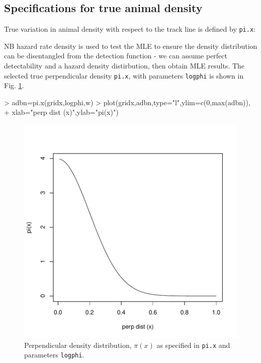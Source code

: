 \documentclass{article}
\begin{document}
\subsection{Specifications for true animal density} 
True variation in animal density with respect to the track line is defined by \texttt{pi.x}:
\begin{Schunk}
\end{Schunk}
NB hazard rate density is used to test the MLE to ensure the density distribution can be disentangled from the detection function -  we can assume perfect detectability and a hazard density distirbution, then obtain MLE results.  The selected true perpendicular density \texttt{pi.x}, with parameters \texttt{logphi} is shown in Fig. \ref{fig:perp.den}.
\begin{Schunk}
\begin{Sinput}
> adbn=pi.x(gridx,logphi,w)
> plot(gridx,adbn,type="l",ylim=c(0,max(adbn)),
+      xlab="perp dist (x)",ylab="pi(x)")
\end{Sinput}
\end{Schunk}
\begin{figure}
\begin{centering}
\includegraphics{simulations-figDen}

\caption{Perpendicular density distribution, $\pi(x)$ as specified in \texttt{pi.x} and parameters \texttt{logphi}.} \label{fig:perp.den}
\end{centering}
\end{figure}
\end{document}
